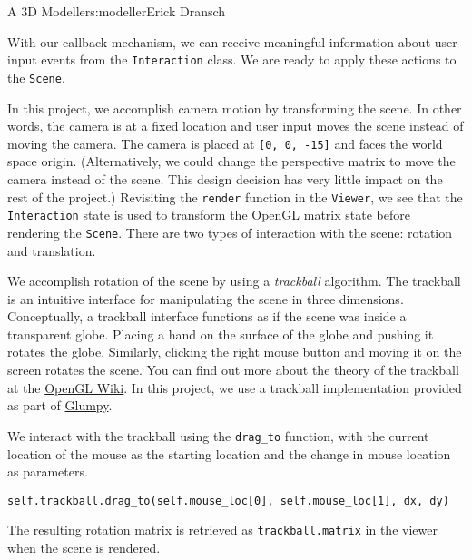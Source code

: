 \begin{aosachapter}{A 3D Modeller}{s:modeller}{Erick Dransch}
\label{interfacing-with-the-scene}

With our callback mechanism, we can receive meaningful information about
user input events from the \texttt{Interaction} class. We are ready to
apply these actions to the \texttt{Scene}.

\label{moving-the-scene}

In this project, we accomplish camera motion by transforming the scene.
In other words, the camera is at a fixed location and user input moves
the scene instead of moving the camera. The camera is placed at
\texttt{{[}0, 0, -15{]}} and faces the world space origin.
(Alternatively, we could change the perspective matrix to move the
camera instead of the scene. This design decision has very little impact
on the rest of the project.) Revisiting the \texttt{render} function in
the \texttt{Viewer}, we see that the \texttt{Interaction} state is used
to transform the OpenGL matrix state before rendering the
\texttt{Scene}. There are two types of interaction with the scene:
rotation and translation.

\label{rotating-the-scene-with-a-trackball}

We accomplish rotation of the scene by using a \emph{trackball}
algorithm. The trackball is an intuitive interface for manipulating the
scene in three dimensions. Conceptually, a trackball interface functions
as if the scene was inside a transparent globe. Placing a hand on the
surface of the globe and pushing it rotates the globe. Similarly,
clicking the right mouse button and moving it on the screen rotates the
scene. You can find out more about the theory of the trackball at the
\href{http://www.opengl.org/wiki/Object_Mouse_Trackball}{OpenGL Wiki}.
In this project, we use a trackball implementation provided as part of
\href{https://code.google.com/p/glumpy/source/browse/glumpy/trackball.py}{Glumpy}.

We interact with the trackball using the \texttt{drag\_to} function,
with the current location of the mouse as the starting location and the
change in mouse location as parameters.

\begin{verbatim}
self.trackball.drag_to(self.mouse_loc[0], self.mouse_loc[1], dx, dy)
\end{verbatim}

The resulting rotation matrix is retrieved as \texttt{trackball.matrix}
in the viewer when the scene is rendered.


\end{aosachapter}
